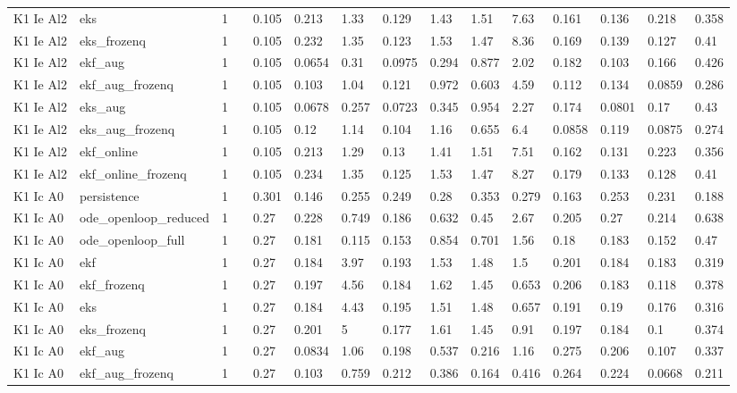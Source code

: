 \begin{table}[t]
\begin{tabular}{lllllllllllllll}
K1 Ie Al2 & eks & 1 &  & 0.105 & 0.213 & 1.33 & 0.129 & 1.43 & 1.51 & 7.63 & 0.161 & 0.136 & 0.218 & 0.358 \\
K1 Ie Al2 & eks\_frozenq & 1 &  & 0.105 & 0.232 & 1.35 & 0.123 & 1.53 & 1.47 & 8.36 & 0.169 & 0.139 & 0.127 & 0.41 \\
K1 Ie Al2 & ekf\_aug & 1 &  & 0.105 & 0.0654 & 0.31 & 0.0975 & 0.294 & 0.877 & 2.02 & 0.182 & 0.103 & 0.166 & 0.426 \\
K1 Ie Al2 & ekf\_aug\_frozenq & 1 &  & 0.105 & 0.103 & 1.04 & 0.121 & 0.972 & 0.603 & 4.59 & 0.112 & 0.134 & 0.0859 & 0.286 \\
K1 Ie Al2 & eks\_aug & 1 &  & 0.105 & 0.0678 & 0.257 & 0.0723 & 0.345 & 0.954 & 2.27 & 0.174 & 0.0801 & 0.17 & 0.43 \\
K1 Ie Al2 & eks\_aug\_frozenq & 1 &  & 0.105 & 0.12 & 1.14 & 0.104 & 1.16 & 0.655 & 6.4 & 0.0858 & 0.119 & 0.0875 & 0.274 \\
K1 Ie Al2 & ekf\_online & 1 &  & 0.105 & 0.213 & 1.29 & 0.13 & 1.41 & 1.51 & 7.51 & 0.162 & 0.131 & 0.223 & 0.356 \\
K1 Ie Al2 & ekf\_online\_frozenq & 1 &  & 0.105 & 0.234 & 1.35 & 0.125 & 1.53 & 1.47 & 8.27 & 0.179 & 0.133 & 0.128 & 0.41 \\
K1 Ic A0 & persistence & 1 &  & 0.301 & 0.146 & 0.255 & 0.249 & 0.28 & 0.353 & 0.279 & 0.163 & 0.253 & 0.231 & 0.188 \\
K1 Ic A0 & ode\_openloop\_reduced & 1 &  & 0.27 & 0.228 & 0.749 & 0.186 & 0.632 & 0.45 & 2.67 & 0.205 & 0.27 & 0.214 & 0.638 \\
K1 Ic A0 & ode\_openloop\_full & 1 &  & 0.27 & 0.181 & 0.115 & 0.153 & 0.854 & 0.701 & 1.56 & 0.18 & 0.183 & 0.152 & 0.47 \\
K1 Ic A0 & ekf & 1 &  & 0.27 & 0.184 & 3.97 & 0.193 & 1.53 & 1.48 & 1.5 & 0.201 & 0.184 & 0.183 & 0.319 \\
K1 Ic A0 & ekf\_frozenq & 1 &  & 0.27 & 0.197 & 4.56 & 0.184 & 1.62 & 1.45 & 0.653 & 0.206 & 0.183 & 0.118 & 0.378 \\
K1 Ic A0 & eks & 1 &  & 0.27 & 0.184 & 4.43 & 0.195 & 1.51 & 1.48 & 0.657 & 0.191 & 0.19 & 0.176 & 0.316 \\
K1 Ic A0 & eks\_frozenq & 1 &  & 0.27 & 0.201 & 5 & 0.177 & 1.61 & 1.45 & 0.91 & 0.197 & 0.184 & 0.1 & 0.374 \\
K1 Ic A0 & ekf\_aug & 1 &  & 0.27 & 0.0834 & 1.06 & 0.198 & 0.537 & 0.216 & 1.16 & 0.275 & 0.206 & 0.107 & 0.337 \\
K1 Ic A0 & ekf\_aug\_frozenq & 1 &  & 0.27 & 0.103 & 0.759 & 0.212 & 0.386 & 0.164 & 0.416 & 0.264 & 0.224 & 0.0668 & 0.211 \\

\end{tabular}
\end{table}
